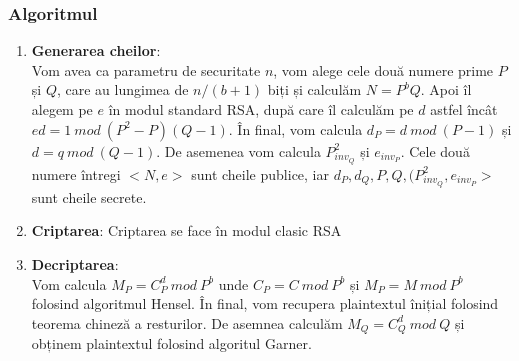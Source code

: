 \documentclass[12]{report}
\begin{document}
		  \subsubsection{Algoritmul}
		  \begin{enumerate}
		  \item \textbf{Generarea cheilor}:\\
		  Vom avea ca parametru de securitate $n$, vom alege cele două numere prime $P$ și $Q$, care au lungimea de $n/(b+1)$ biți și calculăm $N=P^bQ$. Apoi îl alegem pe $e$ în modul standard RSA, după care îl calculăm pe $d$ astfel încât $ed=1 \ mod \ (P^2-P)(Q-1)$. În final, vom calcula $d_P= d \ mod \ (P-1)$ și $d=q \ mod \ (Q-1)$. De asemenea vom calcula $P_{inv_Q}^{2}$ și $e_{inv_P}$. Cele două numere întregi $<N,e>$ sunt cheile publice, iar $d_P,d_Q,P,Q,(P_{inv_Q}^{2},e_{inv_P}>$ sunt cheile secrete.
		  \item \textbf{Criptarea}:
		  Criptarea se face în modul clasic RSA
		  
		  \item \textbf{Decriptarea}: \\
		  Vom calcula $M_P = C_{P}^{d} \ mod \ P^b $ unde $C_P = C \ mod \ P^b$ și  $M_P = M \ mod \ P^b$ folosind algoritmul Hensel. În final, vom recupera plaintextul înițial folosind teorema chineză a resturilor. De asemnea calculăm $M_Q= C_{Q}^{d} \ mod \ Q$ și obținem plaintextul folosind algoritul Garner.
		  \end{enumerate}
		  
\end{document}
